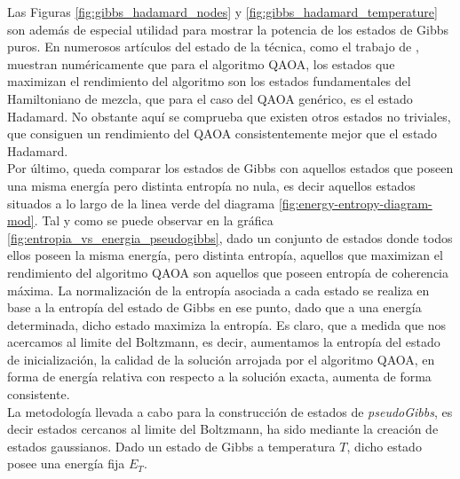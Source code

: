 Las Figuras \ref{fig:gibbs_hadamard_nodes} y \ref{fig:gibbs_hadamard_temperature} son además de especial utilidad para mostrar la potencia de los estados de Gibbs puros. En numerosos artículos del estado de la técnica, como el trabajo de \cite{shaydulin}, muestran numéricamente que para el algoritmo QAOA, los estados que maximizan el rendimiento del algoritmo son los estados fundamentales del Hamiltoniano de mezcla, que para el caso del QAOA genérico, es el estado Hadamard. No obstante aquí se comprueba que existen otros estados no triviales, que consiguen un rendimiento del QAOA consistentemente mejor que el estado Hadamard. \\

Por último, queda comparar los estados de Gibbs con aquellos estados que poseen una misma energía pero distinta entropía no nula, es decir aquellos estados situados a lo largo de la linea verde del diagrama \ref{fig:energy-entropy-diagram-mod}. Tal y como se puede observar en la gráfica \ref{fig:entropia_vs_energia_pseudogibbs}, dado un conjunto de estados donde todos ellos poseen la misma energía, pero distinta entropía, aquellos que maximizan el rendimiento del algoritmo QAOA son aquellos que poseen entropía de coherencia máxima. La normalización de la entropía asociada a cada estado se realiza en base a la entropía del estado de Gibbs en ese punto, dado que a una energía determinada, dicho estado maximiza la entropía. Es claro, que a medida que nos acercamos al limite del Boltzmann, es decir, aumentamos la entropía del estado de inicialización, la calidad de la solución arrojada por el algoritmo QAOA, en forma de energía relativa con respecto a la solución exacta, aumenta de forma consistente. \\

La metodología llevada a cabo para la construcción de estados de \textit{pseudoGibbs}, es decir estados cercanos al limite del Boltzmann, ha sido mediante la creación de estados gaussianos. Dado un estado de Gibbs a temperatura $T$, dicho estado posee una energía fija $E_{T}$.


\newpage

